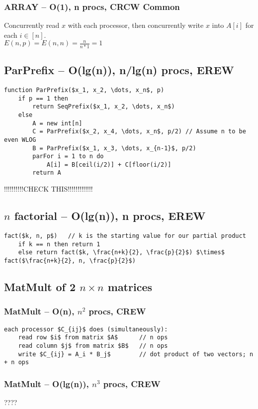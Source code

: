 \documentclass[12pt]{article}
\begin{document}
\subsubsection{ARRAY -- O(1), n procs, CRCW Common}
Concurrently read $x$ with each processor, then concurrently write $x$ into $A[i]$ for each $i \in [n]$.\\
$E(n,p) = E(n,n) = \frac{n}{n*1} = 1$


\subsection{ParPrefix -- O(lg(n)), n/lg(n) procs, EREW}
\begin{lstlisting}
function ParPrefix($x_1, x_2, \dots, x_n$, p)
    if p == 1 then
        return SeqPrefix($x_1, x_2, \dots, x_n$)
    else
        A = new int[n]
        C = ParPrefix($x_2, x_4, \dots, x_n$, p/2) // Assume n to be even WLOG
        B = ParPrefix($x_1, x_3, \dots, x_{n-1}$, p/2)
        parFor i = 1 to n do
            A[i] = B[ceil(i/2)] + C[floor(i/2)]
        return A
\end{lstlisting}
!!!!!!!!!!CHECK THIS!!!!!!!!!!!!!


\subsection{$n$ factorial -- O(lg(n)), n procs, EREW}
\begin{lstlisting}
fact($k, n, p$)   // k is the starting value for our partial product
    if k == n then return 1
    else return fact($k, \frac{n+k}{2}, \frac{p}{2}$) $\times$ fact($\frac{n+k}{2}, n, \frac{p}{2}$)
\end{lstlisting}



\subsection{MatMult of 2 $n\times n$ matrices}
\subsubsection{MatMult -- O(n), $n^2$ procs, CREW}
\begin{lstlisting}
each processor $C_{ij}$ does (simultaneously):
    read row $i$ from matrix $A$      // n ops
    read column $j$ from matrix $B$   // n ops
    write $C_{ij} = A_i * B_j$        // dot product of two vectors; n + n ops
\end{lstlisting}
\subsubsection{MatMult -- O(lg(n)), $n^3$ procs, CREW}
????
\end{document}
